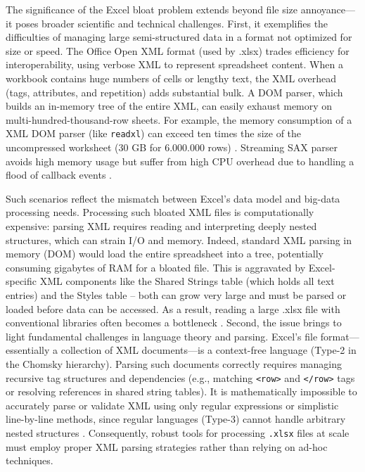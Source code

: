 \documentclass[conference]{IEEEtran}
\begin{document}
The significance of the Excel bloat problem extends beyond file size annoyance—it poses broader scientific and technical challenges. First, it exemplifies the difficulties of managing large semi-structured data in a format not optimized for size or speed. The Office Open XML format (used by .xlsx) trades efficiency for interoperability, using verbose XML to represent spreadsheet content. When a workbook contains huge numbers of cells or lengthy text, the XML overhead (tags, attributes, and repetition) adds substantial bulk. A DOM parser, which builds an in-memory tree of the entire XML, can easily exhaust memory on multi-hundred-thousand-row sheets. For example, the memory consumption of a XML DOM parser (like \texttt{readxl}) can exceed ten times the size of the uncompressed worksheet (30 GB for 6.000.000 rows) \cite{Henze2022SheetReader}.
Streaming SAX parser avoids high memory usage but suffer from high CPU overhead due to handling a flood of callback events \cite{Henze2022SheetReader}. 

Such scenarios reflect the mismatch between Excel’s data model and big-data processing needs. Processing such bloated XML files is computationally expensive: parsing XML requires reading and interpreting deeply nested structures, which can strain I/O and memory. Indeed, standard XML parsing in memory (DOM) would load the entire spreadsheet into a tree, potentially consuming gigabytes of RAM for a bloated file. This is aggravated by Excel-specific XML components like the Shared Strings table (which holds all text entries) and the Styles table – both can grow very large and must be parsed or loaded before data can be accessed. As a result, reading a large .xlsx file with conventional libraries often becomes a bottleneck \cite{sancozta2020spout}. 
Second, the issue brings to light fundamental challenges in language theory and parsing. Excel’s file format—essentially a collection of XML documents—is a context-free language (Type-2 in the Chomsky hierarchy). Parsing such documents correctly requires managing recursive tag structures and dependencies (e.g., matching \texttt{<row>} and \texttt{</row>} tags or resolving references in shared string tables). It is mathematically impossible to accurately parse or validate XML using only regular expressions or simplistic line-by-line methods, since regular languages (Type-3) cannot handle arbitrary nested structures  \cite{Champion2021RegexTips,bobince2009RegexMatchOpenTags}. Consequently, robust tools for processing \texttt{.xlsx} files at scale must employ proper XML parsing strategies rather than relying on ad-hoc techniques.
\end{document}

